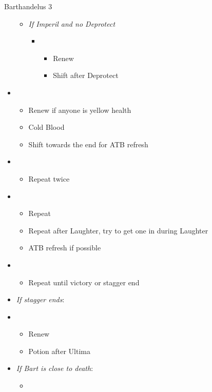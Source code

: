 \begin{battle}{Barthandelus 3}
\begin{multicols}{2}
\begin{itemize}
\begin{itemize}
\begin{itemize}
        \end{itemize}
        \item \textit{If Imperil and no Deprotect}
        \begin{itemize}
            \item \fifth
            \begin{itemize}
                \item Renew
                \item Shift after Deprotect
            \end{itemize}
        \end{itemize}
    \end{itemize}
    \item \sixth
    \begin{itemize}
        \item Renew if anyone is yellow health
        \item Cold Blood
        \item Shift towards the end for ATB refresh
    \end{itemize}
    \item \second
    \begin{itemize}
        \item Repeat twice
    \end{itemize}
    \item \first
    \begin{itemize}
        \item Repeat
        \item Repeat after Laughter, try to get one in during Laughter
        \item ATB refresh if possible
    \end{itemize}
    \item \second
    \begin{itemize}
        \item Repeat until victory or stagger end
    \end{itemize}
    \columnbreak
    \item \textit{If stagger ends}:
    \item \third
    \begin{itemize}
        \item Renew
        \item Potion after Ultima
    \end{itemize}
    \item \textit{If Bart is close to death}:
    \begin{itemize}
        \item \first

\end{itemize}
\end{itemize}
\end{multicols}
\end{battle}
